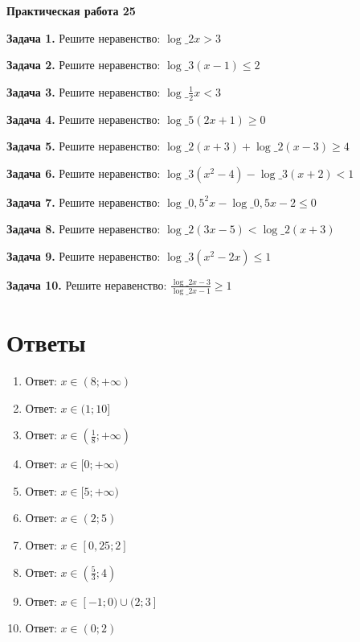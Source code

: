 \documentclass{umk-matematika}
\begin{document}
\begin{center}
{\Large\bfseries Практическая работа 25}
\end{center}
\vspace{0.5cm}

\textbf{Задача 1.} Решите неравенство: $\log\_{2} x > 3$\par\vspace{10pt}
\textbf{Задача 2.} Решите неравенство: $\log\_{3} (x - 1) \le 2$\par\vspace{10pt}
\textbf{Задача 3.} Решите неравенство: $\log\_{\frac{1}{2}} x < 3$\par\vspace{10pt}
\textbf{Задача 4.} Решите неравенство: $\log\_{5} (2x + 1) \ge 0$\par\vspace{10pt}
\textbf{Задача 5.} Решите неравенство: $\log\_{2} (x + 3) + \log\_{2} (x - 3) \ge 4$\par\vspace{10pt}
\textbf{Задача 6.} Решите неравенство: $\log\_{3} (x^2 - 4) - \log\_{3} (x + 2) < 1$\par\vspace{10pt}
\textbf{Задача 7.} Решите неравенство: $\log\_{0{,}5}^{2} x - \log\_{0{,}5} x - 2 \le 0$\par\vspace{10pt}
\textbf{Задача 8.} Решите неравенство: $\log\_{2} (3x - 5) < \log\_{2} (x + 3)$\par\vspace{10pt}
\textbf{Задача 9.} Решите неравенство: $\log\_{3} (x^2 - 2x) \le 1$\par\vspace{10pt}
\textbf{Задача 10.} Решите неравенство: $\frac{\log\_{2} x - 3}{\log\_{2} x - 1} \ge 1$\par\vspace{10pt}
\newpage
\section*{Ответы}

\begin{enumerate}
  \item Ответ: $x \in (8; +\infty)$
  \item Ответ: $x \in (1; 10]$
  \item Ответ: $x \in \left(\frac{1}{8}; +\infty\right)$
  \item Ответ: $x \in [0; +\infty)$
  \item Ответ: $x \in [5; +\infty)$
  \item Ответ: $x \in (2; 5)$
  \item Ответ: $x \in [0{,}25; 2]$
  \item Ответ: $x \in \left(\frac{5}{3}; 4\right)$
  \item Ответ: $x \in [-1; 0) \cup (2; 3]$
  \item Ответ: $x \in (0; 2)$
\end{enumerate}
\end{document}
